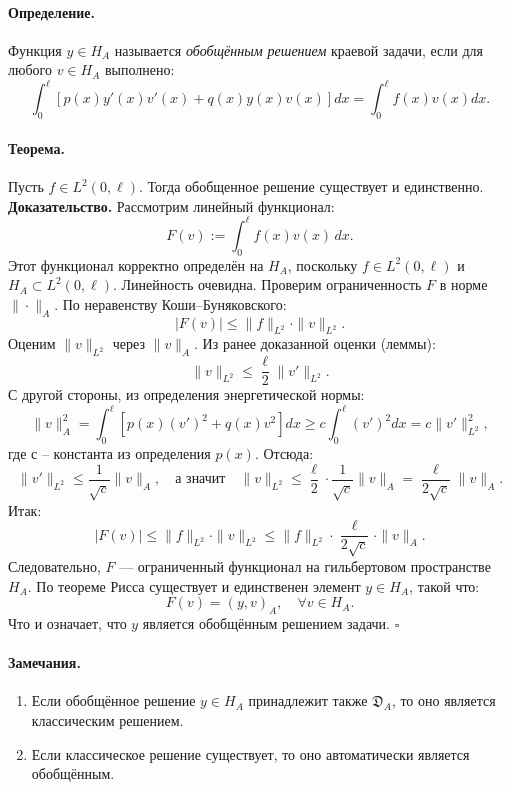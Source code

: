 \paragraph{Определение.}
Функция $y \in H_A$ называется \textit{обобщённым решением} краевой задачи, если для любого $v \in H_A$ выполнено:
\[
\int_0^\ell \left[ p(x) y'(x) v'(x) + q(x) y(x) v(x) \right] dx = \int_0^\ell f(x) v(x) dx.
\]

\paragraph{Теорема.}
Пусть $f \in L^2(0,\ell)$. Тогда обобщенное решение существует и единственно.
\textbf{Доказательство.}
Рассмотрим линейный функционал:
\[
F(v) := \int_0^\ell f(x) v(x) \, dx.
\]
Этот функционал корректно определён на $H_A$, поскольку $f \in L^2(0,\ell)$ и $H_A \subset L^2(0,\ell)$. Линейность очевидна.
Проверим ограниченность \( F \) в норме \( \|\cdot\|_A \). По неравенству Коши--Буняковского:
\[
|F(v)| \le \|f\|_{L^2} \cdot \|v\|_{L^2}.
\]
Оценим \( \|v\|_{L^2} \) через \( \|v\|_A \). Из ранее доказанной оценки (леммы):
\[
\|v\|_{L^2} \le \frac{\ell}{2} \|v'\|_{L^2}.
\]
С другой стороны, из определения энергетической нормы:
\[
\|v\|_A^2 = \int_0^\ell \left[ p(x)(v')^2 + q(x)v^2 \right] dx \ge c \int_0^\ell (v')^2 dx = c \|v'\|_{L^2}^2,
\]
где \(с\) -- константа из определения \(p(x)\).
Отсюда:
\[
\|v'\|_{L^2} \le \frac{1}{\sqrt{c}} \|v\|_A,
\quad \text{а значит} \quad
\|v\|_{L^2} \le \frac{\ell}{2} \cdot \frac{1}{\sqrt{c}} \|v\|_A = \frac{\ell}{2\sqrt{c}} \|v\|_A.
\]
Итак:
\[
|F(v)| \le \|f\|_{L^2} \cdot \|v\|_{L^2} \le \|f\|_{L^2} \cdot \frac{\ell}{2\sqrt{c}} \cdot \|v\|_A.
\]
Следовательно, \( F \) — ограниченный функционал на гильбертовом пространстве \( H_A \).
По теореме Рисса существует и единственен элемент \( y \in H_A \), такой что:
\[
F(v) = (y, v)_A, \quad \forall v \in H_A.
\]
Что и означает, что \( y \) является обобщённым решением задачи. \hfill $\square$

\paragraph{Замечания.}
\begin{enumerate}
  \item Если обобщённое решение $y \in H_A$ принадлежит также $\mathfrak{D}_A$, то оно является классическим решением.
  \item Если классическое решение существует, то оно автоматически является обобщённым.
\end{enumerate}

